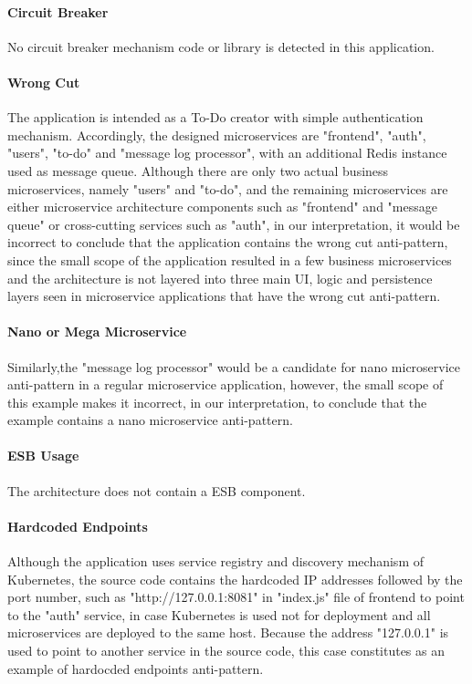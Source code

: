 \documentclass{Configuration_Files/PoliMi3i_thesis}
\begin{document}
\paragraph{Circuit Breaker} No circuit breaker mechanism code or library is detected in this application.

\paragraph{Wrong Cut} The application is intended as a To-Do creator with simple authentication mechanism.
Accordingly, the designed microservices are "frontend", "auth", "users", "to-do" and "message log processor", with an additional Redis instance used as message queue.
Although there are only two actual business microservices, namely "users" and "to-do", and the remaining microservices are either microservice architecture components such as "frontend" and "message queue" or cross-cutting services such as "auth", in our interpretation, it would be incorrect to conclude that the application contains the wrong cut anti-pattern, since the small scope of the application resulted in a few business microservices and the architecture is not layered into three main UI, logic and persistence layers seen in microservice applications that have the wrong cut anti-pattern.

\paragraph{Nano or Mega Microservice} Similarly,the "message log processor" would be a candidate for nano microservice anti-pattern in a regular microservice application, however, the small scope of this example makes it incorrect, in our interpretation, to conclude that the example contains a nano microservice anti-pattern.

\paragraph{ESB Usage} The architecture does not contain a ESB component.

\paragraph{Hardcoded Endpoints} Although the application uses service registry and discovery mechanism of Kubernetes, the source code contains the hardcoded IP addresses followed by the port number, such as "http://127.0.0.1:8081" in "index.js" file of frontend to point to the "auth" service, in case Kubernetes is used not for deployment and all microservices are deployed to the same host.
Because the address "127.0.0.1" is used to point to another service in the source code, this case constitutes as an example of hardocded endpoints anti-pattern.
\end{document}

